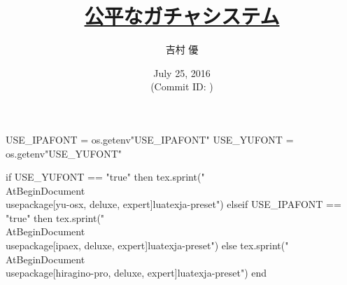 \hypersetup{colorlinks,linkcolor=,urlcolor=links}

\beamertemplatenavigationsymbolsempty


\usepackage{luacode}
\usepackage{luatexja}
\usepackage{pgfpages}
\usepackage[osf]{mathpazo}

\begin{luacode*}
  USE_IPAFONT = os.getenv"USE_IPAFONT"
  USE_YUFONT = os.getenv"USE_YUFONT"
  
  if USE_YUFONT == "true" then
    tex.sprint("\\AtBeginDocument{\\usepackage[yu-osx, deluxe, expert]{luatexja-preset}}")
  elseif USE_IPAFONT == "true" then
    tex.sprint("\\AtBeginDocument{\\usepackage[ipaex, deluxe, expert]{luatexja-preset}}")
  else
    tex.sprint("\\AtBeginDocument{\\usepackage[hiragino-pro, deluxe, expert]{luatexja-preset}}")
  end
\end{luacode*}

\usepackage{epigraph}
\usepackage{etoolbox}
\usepackage{tikz}
\usepackage{framed}
\usepackage{libertine}
\usepackage{amsmath}
\usepackage{mathtools}

\renewcommand{\kanjifamilydefault}{\gtdefault}


\setmainfont[Numbers=OldStyle, BoldFont=Palatino Bold]{Palatino}
\setsansfont{CMU Sans Serif}
\setmonofont{CMU Typewriter Text}



\title[\href{http://qiita.com/yyu/items/fce9b33c784e0631ddf6}{公平なガチャシステム}]{%
  \href{http://qiita.com/yyu/items/fce9b33c784e0631ddf6}{公平なガチャシステム}
}
\author{吉村 優}
\date[July 25, 2016]{%
  July 25, 2016 \\%
  {\footnotesize (Commit ID: \GITAbrHash)}
}

